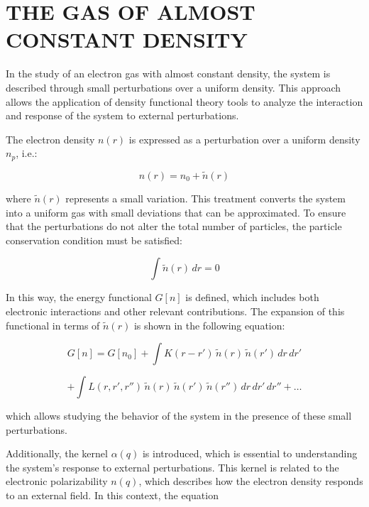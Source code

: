 \documentclass[%
 preprint, linenumbers,
 amsmath,amssymb,
 aps, physrev,
]{revtex4-2}
\begin{document}
\section{\textbf{THE GAS OF ALMOST CONSTANT DENSITY}}

In the study of an electron gas with almost constant density, the system is described through small perturbations over a uniform density. This approach allows the application of density functional theory tools to analyze the interaction and response of the system to external perturbations.

The electron density \( n(r) \) is expressed as a perturbation over a uniform density \( n_p \), i.e.:

\begin{equation}
n(r) = n_0 + \tilde{n}(r)
\end{equation}

where \( \tilde{n}(r) \) represents a small variation. This treatment converts the system into a uniform gas with small deviations that can be approximated. To ensure that the perturbations do not alter the total number of particles, the particle conservation condition must be satisfied:

\begin{equation}
\int \tilde{n}(r) \, dr = 0
\end{equation}

In this way, the energy functional \( G[n] \) is defined, which includes both electronic interactions and other relevant contributions. The expansion of this functional in terms of \( \tilde{n}(r) \) is shown in the following equation:

\begin{equation}
G[n] = G[n_0] + \int K(r - r') \, \tilde{n}(r) \, \tilde{n}(r') \, dr \, dr'
\end{equation}

\begin{equation}
    + \int L(r, r', r'') \, \tilde{n}(r) \, \tilde{n}(r') \, \tilde{n}(r'') \, dr \, dr' \, dr'' + \dots
\end{equation}

which allows studying the behavior of the system in the presence of these small perturbations.

Additionally, the kernel \( \alpha(q) \) is introduced, which is essential to understanding the system's response to external perturbations. This kernel is related to the electronic polarizability \( n(q) \), which describes how the electron density responds to an external field. In this context, the equation
\end{document}
